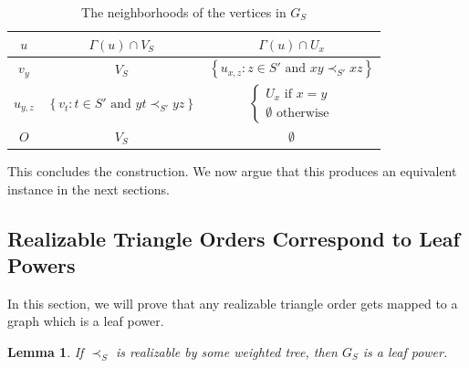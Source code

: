 \documentclass[11pt, letter]{article}
\newtheorem{lemma}[theorem]{Lemma}
\theoremstyle{remark}
\newcommand{\set}[1]{\left\{#1\right\}}
\begin{document}
\begin{table}[ht!]
    \centering
    \begin{tabular}{c|c|c}
         $u$ & $\Gamma(u)\cap V_S$ & $\Gamma(u)\cap U_x$\\
         \hline
         $v_y$ & $V_S$ & $\set{u_{x,z}:z\in S'\text{ and }xy\prec_{S'} xz}
         $\\
         \hline
         $u_{y,z}$ & $\set{v_t:t\in S'\text{ and }yt\prec_{S'}yz}$ & $\begin{cases}
             U_x\text{ if }x=y\\
             \emptyset\text{ otherwise}
         \end{cases}$\\
         \hline
         $O$ & $V_S$ & $\emptyset$
    \end{tabular}
    \caption{The neighborhoods of the vertices in $G_S$}
    \label{tab:G_S}
\end{table}

This concludes the construction.  We now argue that this produces an equivalent instance in the next sections.

\subsection{Realizable Triangle Orders Correspond to Leaf Powers}\label{sec:TOC-to-LP}

In this section, we will prove that any realizable triangle order gets mapped to a graph which is a leaf power.

\begin{lemma}\label{lem:TOC to LP}
    If $\prec_S$ is realizable by some weighted tree, then $G_S$ is a leaf power.
\end{lemma}
\end{document}
